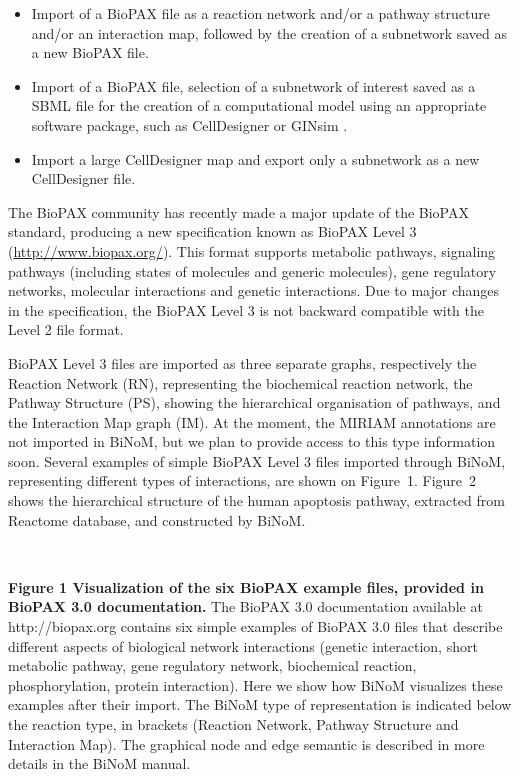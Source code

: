 \documentclass[11pt]{bmc_article_s50}
\newenvironment{bmcformat}{\begin{raggedright}\baselineskip20pt\sloppy\setboolean{publ}{false}}{\end{raggedright}\baselineskip20pt\sloppy}
\begin{document}
\begin{bmcformat}
\begin{itemize}
\item Import of a BioPAX file as a reaction network and/or a pathway structure
and/or an interaction map, followed by the creation of a subnetwork
saved as a new BioPAX file.

\item Import of a BioPAX file, selection of a subnetwork of interest saved as a
SBML file for
the creation of a computational model using an appropriate software package,
such as CellDesigner \cite{funahashi2003celldesigner} or GINsim
\cite{gonzalez2006ginsim}.

\item Import a large CellDesigner map and export only a subnetwork as a new CellDesigner file.

\end{itemize}
\vspace{-5pt}
The BioPAX
community has recently made a major update of the BioPAX standard, producing a
new specification known as BioPAX Level 3 (\url{http://www.biopax.org/}). This
format supports metabolic pathways, signaling pathways (including states of molecules
and generic molecules), gene regulatory networks, molecular interactions and
genetic interactions. Due to major changes in the
specification, the BioPAX Level 3 is not backward compatible with the Level 2 file format.

BioPAX Level 3 files are imported as three
separate graphs, respectively the Reaction Network (RN), representing the
biochemical reaction network, the Pathway Structure (PS), showing the
hierarchical organisation of pathways, and the Interaction Map graph
(IM). At the moment, the MIRIAM annotations are not imported in BiNoM, but we
plan to provide access to this type information soon. Several examples of simple
BioPAX Level 3 files imported through BiNoM,
representing different types of interactions, are shown on Figure~1. Figure~2
shows the hierarchical structure of the human apoptosis pathway, extracted
from Reactome database, and constructed by BiNoM.

\hrulefill\

\vspace*{-15pt}
\textbf{Figure 1 Visualization of the six BioPAX example files, provided in BioPAX 3.0 documentation.}
The BioPAX 3.0 documentation available at http://biopax.org contains six simple examples
of BioPAX 3.0 files that describe different aspects of biological network
interactions (genetic interaction, short metabolic pathway, gene regulatory
network, biochemical reaction, phosphorylation, protein interaction). Here we
show how BiNoM visualizes these examples after their import. The BiNoM type of
representation is indicated below the reaction type, in brackets (Reaction
Network, Pathway Structure and Interaction Map). The graphical node and edge
semantic is described in more details in the BiNoM manual.


\end{bmcformat}
\end{document}
